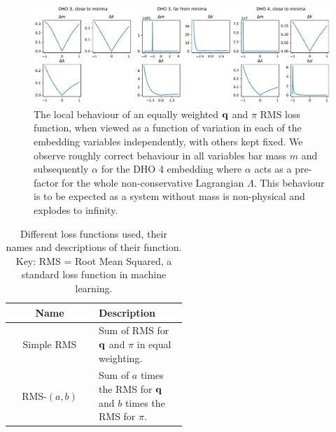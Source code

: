 \begin{figure}[t]
  \includegraphics[width=\textwidth]{figures/loss-function-behaviour.pdf}
  \caption{The local behaviour of an equally weighted $\vb{q}$ and $\pi$ RMS loss function, when viewed as a function of variation in each of the embedding variables independently, with others kept fixed. We observe roughly correct behaviour in all variables bar mass $m$ and subsequently $\alpha$ for the DHO 4 embedding where $\alpha$ acts as a pre-factor for the whole non-conservative Lagrangian $\Lambda$. This behaviour is to be expected as a system without mass is non-physical and explodes to infinity.}
  \label{fig:loss-function-behaviour}
\end{figure}

\begin{table}
\label{table:loss-fns}
\centering
\caption{Different loss functions used, their names and descriptions of their function. Key: RMS = Root Mean Squared, a standard loss function in machine learning.%
}
\begin{tabular}{c|p{0.5\linewidth}}
  Name & Description \\
  \hline
  Simple RMS & Sum of RMS for $\vb{q}$ and $\pi$ in equal weighting. \\
  RMS-$(a, b)$ & Sum of $a$ times the RMS for $\vb{q}$ and $b$ times the RMS for $\pi$. \\
\end{tabular}
\end{table}


